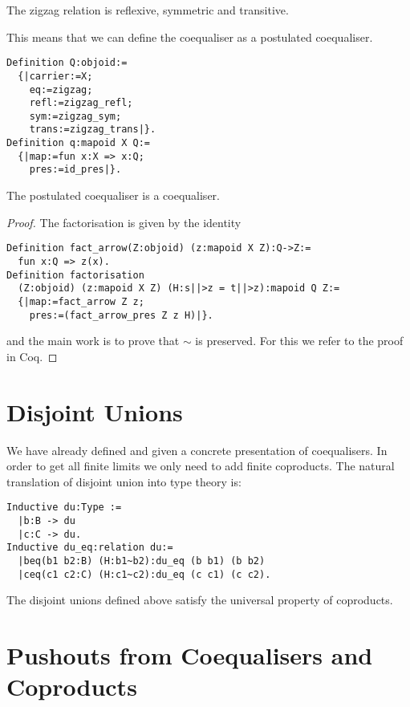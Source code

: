 \documentclass{article}
\begin{document}
\begin{lemma}
  The zigzag relation is reflexive, symmetric and transitive.
\end{lemma}

This means that we can define the coequaliser as a postulated coequaliser.

\begin{verbatim}
Definition Q:objoid:=
  {|carrier:=X;
    eq:=zigzag;
    refl:=zigzag_refl;
    sym:=zigzag_sym;
    trans:=zigzag_trans|}.
Definition q:mapoid X Q:=
  {|map:=fun x:X => x:Q;
    pres:=id_pres|}.
\end{verbatim}

\begin{proposition}
  The postulated coequaliser is a coequaliser.
  \begin{proof}
    The factorisation is given by the identity 
    \begin{verbatim}
Definition fact_arrow(Z:objoid) (z:mapoid X Z):Q->Z:=
  fun x:Q => z(x).    
Definition factorisation
  (Z:objoid) (z:mapoid X Z) (H:s||>z = t||>z):mapoid Q Z:=
  {|map:=fact_arrow Z z;
    pres:=(fact_arrow_pres Z z H)|}.
\end{verbatim}
    and the main work is to prove that $\sim$ is preserved.
    For this we refer to the proof in Coq.
  \end{proof}
\end{proposition}

\section{Disjoint Unions}
\label{sec:disjoint-unions}

We have already defined and given a concrete presentation of coequalisers.
In order to get all finite limits we only need to add finite coproducts.
The natural translation of disjoint union into type theory is:
\begin{verbatim}
Inductive du:Type :=
  |b:B -> du
  |c:C -> du.
Inductive du_eq:relation du:=
  |beq(b1 b2:B) (H:b1~b2):du_eq (b b1) (b b2)
  |ceq(c1 c2:C) (H:c1~c2):du_eq (c c1) (c c2).
\end{verbatim}

\begin{proposition}
  The disjoint unions defined above satisfy the universal property of coproducts.
\end{proposition}

\section{Pushouts from Coequalisers and Coproducts}
\label{sec:pushouts-from-coeq-and-coprod}
\end{document}
